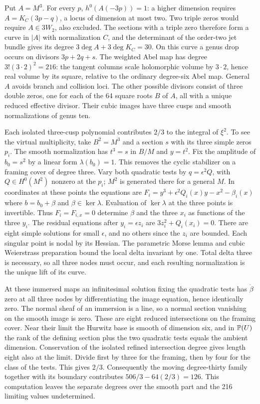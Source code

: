 Put $A=M^3$. For every $p$, $h^0(A(-3p))=1$: a higher dimension
requires $A=K_C(3p-q)$, a locus of dimension at most two. Two
triple zeros would require $A\in3W_2$, also excluded. The sections
with a triple zero therefore form a curve in $|A|$ with normalization
$C$, and the determinant of the order-two jet bundle gives its
degree $3\deg A+3\deg K_C=30$. On this curve a genus drop occurs
on divisors $3p+2q+s$. The weighted Abel map has degree
$3!(3\cdot2)^2=216$: the tangent columns scale holomorphic volume
by $3\cdot2$, hence real volume by its square, relative to the
ordinary degree-six Abel map. General $A$ avoids branch and collision
loci. The other possible divisors consist of three double zeros,
one for each of the 64 square roots $B$ of $A$, all with a unique
reduced effective divisor. Their cubic images have three cusps and
smooth normalizations of genus ten.

Each isolated three-cusp polynomial contributes $2/3$ to the integral
of $\xi^2$. To see the virtual multiplicity, take $B^2=M^3$ and a
section $s$ with its three simple zeros $p_i$. The smooth normalization
has $t^3=s$ in $B/M$ and $y=t^2$. Fix the amplitude of $b_0=s^2$
by a linear form $\lambda(b_0)=1$. This removes the cyclic stabilizer
on a framing cover of degree three. Vary both quadratic tests by
$q=\epsilon^2Q$, with $Q\in H^0(M^2)$ nonzero at the $p_i$;
$M^2$ is generated there for a general $M$. In coordinates at these
points the equations are $F_i=y^3+\epsilon^2Q_i(x)y-x^2-\beta_i(x)$
where $b=b_0+\beta$ and $\beta\in\ker\lambda$. Evaluation
of $\ker\lambda$ at the three points is invertible. Thus $F_i=F_{i,x}=0$
determine $\beta$ and the three $x_i$ as functions of the three
$y_i$. The residual equations after $y_i=\epsilon z_i$ are
$3z_i^2+Q_i(x_i)=0$. There are eight simple solutions for small
$\epsilon$, and no others since the $z_i$ are bounded. Each singular
point is nodal by its Hessian. The parametric Morse lemma and cubic
Weierstrass preparation bound the local delta invariant by one.
Total delta three is necessary, so all three nodes must occur, and
each resulting normalization is the unique lift of its curve.

At these immersed maps an infinitesimal solution fixing the quadratic
tests has $\dot\beta$ zero at all three nodes by differentiating the
image equation, hence identically zero. The normal sheaf of an
immersion is a line, so a normal section vanishing on the smooth image
is zero. These are eight reduced intersections on the framing cover.
Near their limit the Hurwitz base is smooth of dimension six,
and in $\mathbb P(U)$ the rank of the defining section plus the two
quadratic tests equals the ambient dimension. Conservation of the
isolated refined intersection degree gives length eight also at
the limit. Divide first by three for the framing, then by four for
the class of the tests. This gives $2/3$. Consequently the moving
degree-thirty family together with its boundary contributes
$506/3-64(2/3)=126$. This computation leaves the separate degrees
over the smooth part and the 216 limiting values undetermined.

